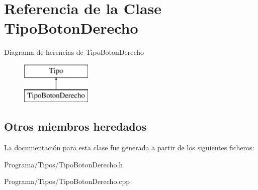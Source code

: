 \hypertarget{class_tipo_boton_derecho}{\section{Referencia de la Clase Tipo\-Boton\-Derecho}
\label{class_tipo_boton_derecho}
}
Diagrama de herencias de Tipo\-Boton\-Derecho\begin{figure}[H]
\begin{center}
\leavevmode
\includegraphics[height=2.000000cm]{class_tipo_boton_derecho}
\end{center}
\end{figure}
\subsection*{Otros miembros heredados}


La documentación para esta clase fue generada a partir de los siguientes ficheros\-:\begin{DoxyCompactItemize}
\item 
Programa/\-Tipos/Tipo\-Boton\-Derecho.\-h\item 
Programa/\-Tipos/Tipo\-Boton\-Derecho.\-cpp\end{DoxyCompactItemize}
